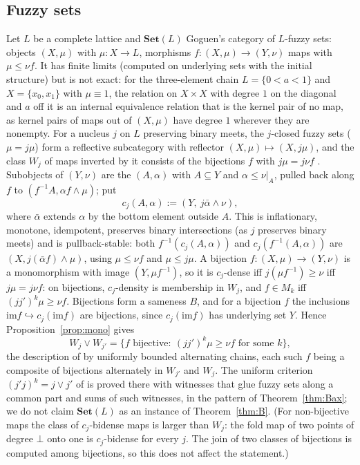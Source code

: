 \documentclass[11pt]{amsart}
\theoremstyle{definition}
\newcommand{\im}{\mathrm{im}}
\newcommand{\Set}{\mathbf{Set}}
\begin{document}
\subsection{Fuzzy sets}\label{sub:fuzzy}
Let $L$ be a complete lattice and $\Set(L)$ Goguen's category of $L$-fuzzy
sets: objects $(X,\mu)$ with $\mu\colon X\to L$, morphisms $f\colon(X,\mu)
\to(Y,\nu)$ maps with $\mu\le\nu f$. It has finite limits (computed on
underlying sets with the initial structure) but is not exact: for the
three-element chain $L=\{0<a<1\}$ and $X=\{x_0,x_1\}$ with $\mu\equiv1$, the
relation on $X\times X$ with degree $1$ on the diagonal and $a$ off it is an
internal equivalence relation that is the kernel pair of no map, as kernel
pairs of maps out of $(X,\mu)$ have degree $1$ wherever they are nonempty.
For a nucleus $j$ on $L$ preserving binary meets, the $j$-closed fuzzy sets
($\mu=j\mu$) form a reflective subcategory with reflector $(X,\mu)\mapsto
(X,j\mu)$, and the class $W_j$ of maps inverted by it consists of the
bijections $f$ with $j\mu=j\nu f$ \cite{Fuzzysame}. Subobjects of $(Y,\nu)$
are the $(A,\alpha)$ with $A\subseteq Y$ and $\alpha\le\nu|_A$, pulled back
along $f$ to $(f^{-1}A,\alpha f\wedge\mu)$; put
\[
c_j(A,\alpha):=(Y,\ j\bar\alpha\wedge\nu),
\]
where $\bar\alpha$ extends $\alpha$ by the bottom element outside $A$. This
is inflationary, monotone, idempotent, preserves binary intersections (as
$j$ preserves binary meets) and is pullback-stable: both
$f^{-1}(c_j(A,\alpha))$ and $c_j(f^{-1}(A,\alpha))$ are
$(X,j(\bar\alpha f)\wedge\mu)$, using $\mu\le\nu f$ and $\mu\le j\mu$. A
bijection $f\colon(X,\mu)\to(Y,\nu)$ is a monomorphism with image
$(Y,\mu f^{-1})$, so it is $c_j$-dense iff $j(\mu f^{-1})\ge\nu$ iff
$j\mu=j\nu f$: on bijections, $c_j$-density is membership in $W_j$, and
$f\in M_k$ iff $(jj')^k\mu\ge\nu f$. Bijections form a sameness $B$, and for
a bijection $f$ the inclusions $\im f\hookrightarrow c_j(\im f)$ are
bijections, since $c_j(\im f)$ has underlying set $Y$. Hence
Proposition~\ref{prop:mono} gives
\[
W_j\vee W_{j'}=\{f\text{ bijective}:\ (jj')^k\mu\ge\nu f\text{ for some }k\},
\]
the description of \cite[Lemma~4.1, Thm.~4.3]{Fuzzysame} by uniformly
bounded alternating chains, each such $f$ being a composite of bijections
alternately in $W_{j'}$ and $W_j$. The uniform criterion
$(j'j)^k=j\vee j'$ of \cite[Thm.~1.1(ii)]{Fuzzysame} is proved there with
witnesses that glue fuzzy sets along a common part and sums of such
witnesses, in the pattern of Theorem~\ref{thm:Bax}; we do not claim
$\Set(L)$ as an instance of Theorem~\ref{thm:B}. (For non-bijective maps the
class of $c_j$-bidense maps is larger than $W_j$: the fold map of two points
of degree $\bot$ onto one is $c_j$-bidense for every $j$. The join of two
classes of bijections is computed among bijections, so this does not affect
the statement.)
\end{document}
